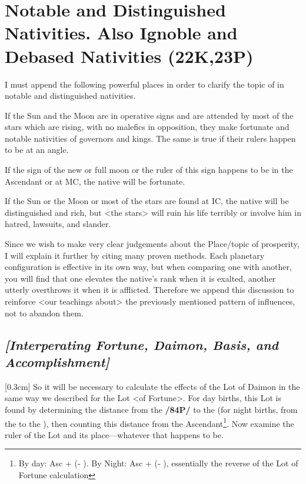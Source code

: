\section{Notable and Distinguished Nativities. Also Ignoble and Debased Nativities (22K,23P)}

I must append the following powerful places in order to clarify the topic of in notable and distinguished nativities. 

If the Sun and the Moon are in operative signs and are attended by most of the stars which are rising, with no malefics in opposition, they make fortunate and notable nativities of governors and kings. The same is true if their rulers happen to be at an angle. 

If the sign of the new or full moon or the ruler of
this sign happens to be in the Ascendant or at MC, the native will be fortunate. 

If the Sun or the Moon or most of the stars are found at IC, the native will be distinguished and rich, but <the stars> will ruin his life terribly or involve him in hatred, lawsuits, and slander.

Since \mndl we wish to make very clear judgements about the Place/topic of prosperity, I will explain it further by citing many proven methods. Each planetary configuration is effective in its own way, but when comparing one with another, you will find that one elevates the native’s rank when it is exalted, another
utterly overthrows it when it is afflicted. Therefore we append this discussion to reinforce <our teachings about> the previously mentioned pattern of influences, not to abandon them.

\subsection{\textit{[Interperating Fortune, Daimon, Basis, and Accomplishment]}}
[0.3cm]
So it will be necessary to calculate the effects of the Lot of Daimon in the same way we described for the Lot <of Fortune>. For day births, this Lot is found by determining the distance from the \Moon\xspace \textbf{/84P/} to the \Sun\xspace (for night births, from the \Sun\xspace to the \Moon), then counting this distance from the Ascendant\footnote{By day: Asc + (\Sun\xspace\xspace - \Moon). By Night: Asc + (\Moon\xspace\xspace - \Sun), essentially the reverse of the Lot of Fortune calculation}. Now examine the ruler of the Lot and its place—whatever that happens to be. 

